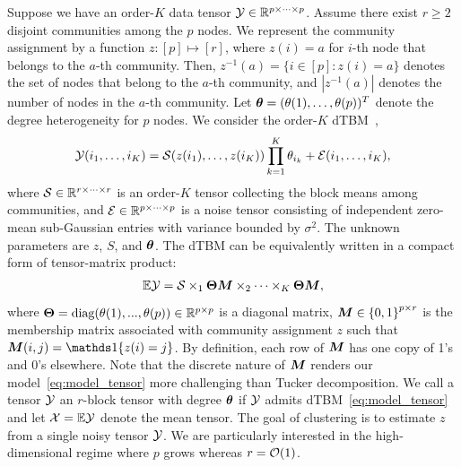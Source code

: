 \documentclass[journal]{IEEEtran}
\theoremstyle{definition}
\theoremstyle{definition}
\newcommand{\offf}[1]{\left\{#1\right\}}
\begin{document}
Suppose we have an order-$K$ data tensor $\mathcal{Y} \in \mathbb{R}^{p \times \cdots \times p}$. %
Assume there exist $r \geq 2$  disjoint communities among the $p$ nodes. We represent the community assignment by a function $z \colon [p]\mapsto[r]$, where $z(i) = a$ for $i$-th node that belongs to the $a$-th community. Then, $z^{-1}(a)=\{i\in[p]\colon z(i)=a\}$ denotes the set of nodes that belong to the $a$-th community, and $|z^{-1}(a)|$ denotes the number of nodes in the $a$-th community. Let $\boldsymbol{\theta}=(\theta(1),\ldots,\theta(p))^T$ denote the degree heterogeneity for $p$ nodes. We consider the order-$K$ dTBM~\citep{ghoshdastidar2017consistency,ke2019community},
\small
\begin{equation}\label{eq:model_margin}
    \tY(i_1,\ldots,i_K) = \tS(z(i_1),\ldots,z(i_K)) \prod_{k = 1}^K\theta_{i_k} + \tE(i_1,\ldots,i_K), 
\end{equation}
\normalsize
where $\mathcal{S} \in \mathbb{R}^{r \times \cdots \times r}$ is an order-$K$ tensor collecting the block means among communities, and %
$\mathcal{E}\in\mathbb{R}^{p\times \cdots \times p}$ is a noise tensor consisting of independent zero-mean sub-Gaussian entries with variance bounded by $\sigma^2$. 
The unknown parameters are $z$, $S$, and $\boldsymbol{\theta}$. The dTBM can be equivalently written in a compact form of tensor-matrix product:
\begin{equation}\label{eq:model_tensor}
\bbE\tY = \tS \times_1 \mTheta \mM \times_2 \cdots \times_K  \mTheta \mM,
\end{equation}
where $\boldsymbol{\Theta} = \text{diag}(\theta(1),...,\theta(p)) \in \mathbb{R}^{p \times p}$ is a diagonal matrix, $\mM \in \offf{0,1}^{p \times r}$ is the membership matrix associated with community assignment $z$ such that $\mM(i,j)=\ind\{z(i)=j\}$. By definition, each row of $\bm M$ has one copy of 1's and 0's elsewhere. Note that the discrete nature of $\bm M$ renders our model~\eqref{eq:model_tensor} more challenging than Tucker decomposition. We call a tensor $\mathcal{Y}$ an $r$-block tensor with degree $\boldsymbol{\theta}$ if $\mathcal{Y}$ admits dTBM~\eqref{eq:model_tensor}   {and let $\mathcal{X} = \mathbb{E} \mathcal{Y}$ denote the mean tensor.} The goal of clustering is to estimate $z$ from a single noisy tensor $\mathcal{Y}$. We are particularly interested in the high-dimensional regime where $p$ grows whereas $r=\mathcal{O}(1)$. 
\end{document}
